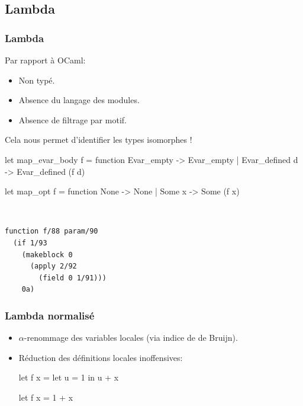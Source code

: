 \documentclass[11pt]{beamer}
\newenvironment{ocaml}
{\small\VerbatimEnvironment
	\begin{myocaml}}
	{\end{myocaml}}
\begin{document}
\subsection{Lambda}
\begin{frame}[fragile]
\frametitle{Lambda}
Par rapport à OCaml:
\begin{itemize}
	\item Non typé.
	\item Absence du langage des modules.
	\item Absence de filtrage par motif.
\end{itemize}
\pause
Cela nous permet d'identifier les types isomorphes !
\begin{ocaml}
let map_evar_body f = function
  Evar_empty     -> Evar_empty 
| Evar_defined d -> Evar_defined (f d)
\end{ocaml}

\begin{multicols}{2}
\begin{ocaml}
let map_opt f = function
  None -> None
| Some x -> Some (f x)
\end{ocaml}
$ $\\
\begin{verbatim}
function f/88 param/90 
  (if 1/93 
    (makeblock 0 
      (apply 2/92 
        (field 0 1/91)))
    0a)
\end{verbatim}

\end{multicols}

\end{frame}

\begin{frame}[fragile]
\frametitle{Lambda \alert{normalisé}}
\begin{itemize}
	\item $\alpha$-renommage des variables locales (via indice de de Bruijn).
	\item Réduction des définitions locales inoffensives:
\begin{multicols}{2}
\begin{ocaml}
let f x =
  let u = 1 in u + x
\end{ocaml}
\begin{ocaml}
let f x =
  1 + x
\end{ocaml}
\end{multicols}
\end{itemize}
\end{frame}
\end{document}
